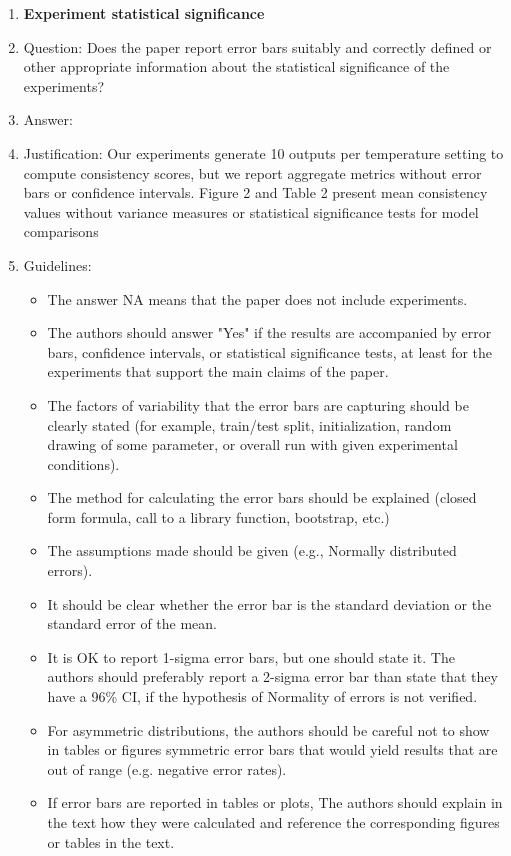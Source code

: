 \documentclass{article}
\begin{document}
\begin{enumerate}
\item {\bf Experiment statistical significance}
    \item[] Question: Does the paper report error bars suitably and correctly defined or other appropriate information about the statistical significance of the experiments?
    \item[] Answer: \answerNo{} %
    \item[] Justification: \justification Our experiments generate 10 outputs per temperature setting to compute consistency scores, but we report aggregate metrics without error bars or confidence intervals. Figure 2 and Table 2 present mean consistency values without variance measures or statistical significance tests for model comparisons{}
    \item[] Guidelines:
    \begin{itemize}
        \item The answer NA means that the paper does not include experiments.
        \item The authors should answer "Yes" if the results are accompanied by error bars, confidence intervals, or statistical significance tests, at least for the experiments that support the main claims of the paper.
        \item The factors of variability that the error bars are capturing should be clearly stated (for example, train/test split, initialization, random drawing of some parameter, or overall run with given experimental conditions).
        \item The method for calculating the error bars should be explained (closed form formula, call to a library function, bootstrap, etc.)
        \item The assumptions made should be given (e.g., Normally distributed errors).
        \item It should be clear whether the error bar is the standard deviation or the standard error of the mean.
        \item It is OK to report 1-sigma error bars, but one should state it. The authors should preferably report a 2-sigma error bar than state that they have a 96\% CI, if the hypothesis of Normality of errors is not verified.
        \item For asymmetric distributions, the authors should be careful not to show in tables or figures symmetric error bars that would yield results that are out of range (e.g. negative error rates).
        \item If error bars are reported in tables or plots, The authors should explain in the text how they were calculated and reference the corresponding figures or tables in the text.
    \end{itemize}


\end{enumerate}
\end{document}
